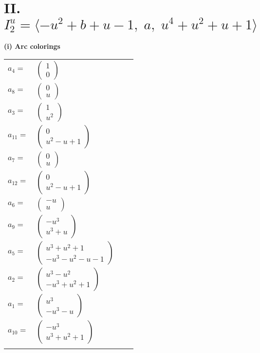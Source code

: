 \documentclass[1p]{elsarticle_modified}
\theoremstyle{definition}
\begin{document}
\centering \section*{II. $I^u_{2}= \langle - u^2+b+u-1,\;a,\;u^4+u^2+u+1 \rangle$}
\flushleft \textbf{(i) Arc colorings}\\
\begin{tabular}{m{7pt} m{180pt} m{7pt} m{180pt} }
\flushright $a_{4}=$&$\begin{pmatrix}1\\0\end{pmatrix}$ \\
\flushright $a_{8}=$&$\begin{pmatrix}0\\u\end{pmatrix}$ \\
\flushright $a_{3}=$&$\begin{pmatrix}1\\u^2\end{pmatrix}$ \\
\flushright $a_{11}=$&$\begin{pmatrix}0\\u^2- u+1\end{pmatrix}$ \\
\flushright $a_{7}=$&$\begin{pmatrix}0\\u\end{pmatrix}$ \\
\flushright $a_{12}=$&$\begin{pmatrix}0\\u^2- u+1\end{pmatrix}$ \\
\flushright $a_{6}=$&$\begin{pmatrix}- u\\u\end{pmatrix}$ \\
\flushright $a_{9}=$&$\begin{pmatrix}- u^3\\u^3+u\end{pmatrix}$ \\
\flushright $a_{5}=$&$\begin{pmatrix}u^3+u^2+1\\- u^3- u^2- u-1\end{pmatrix}$ \\
\flushright $a_{2}=$&$\begin{pmatrix}u^3- u^2\\- u^3+u^2+1\end{pmatrix}$ \\
\flushright $a_{1}=$&$\begin{pmatrix}u^3\\- u^3- u\end{pmatrix}$ \\
\flushright $a_{10}=$&$\begin{pmatrix}- u^3\\u^3+u^2+1\end{pmatrix}$\\&\end{tabular}
\end{document}
